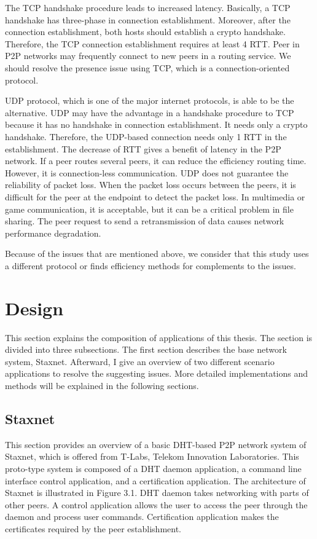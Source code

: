 The TCP handshake procedure leads to increased latency. Basically, a TCP handshake has three-phase in connection establishment. Moreover, after the connection establishment, both hosts should establish a crypto handshake. Therefore, the TCP connection establishment requires at least 4 RTT. Peer in P2P networks may frequently connect to new peers in a routing service. We should resolve the presence issue using TCP, which is a connection-oriented protocol.

UDP protocol, which is one of the major internet protocols, is able to be the alternative. UDP may have the advantage in a handshake procedure to TCP because it has no handshake in connection establishment. It needs only a crypto handshake. Therefore, the UDP-based connection needs only 1 RTT in the establishment. The decrease of RTT gives a benefit of latency in the P2P network. If a peer routes several peers, it can reduce the efficiency routing time. However, it is connection-less communication. UDP does not guarantee the reliability of packet loss. When the packet loss occurs between the peers, it is difficult for the peer at the endpoint to detect the packet loss. In multimedia or game communication, it is acceptable, but it can be a critical problem in file sharing. The peer request to send a retransmission of data causes network performance degradation.

Because of the issues that are mentioned above, we consider that this study uses a different protocol or finds efficiency methods for complements to the issues.

\section{Design}

This section explains the composition of applications of this thesis. The section is divided into three subsections. The first section describes the base network system, Staxnet. Afterward, I give an overview of two different scenario applications to resolve the suggesting issues. More detailed implementations and methods will be explained in the following sections.

\subsection{Staxnet}

This section provides an overview of a basic DHT-based P2P network system of Staxnet, which is offered from T-Labs, Telekom Innovation Laboratories. This proto-type system is composed of a DHT daemon application, a command line interface control application, and a certification application. The architecture of Staxnet is illustrated in Figure 3.1. DHT daemon takes networking with parts of other peers. A control application allows the user to access the peer through the daemon and process user commands. Certification application makes the certificates required by the peer establishment.

